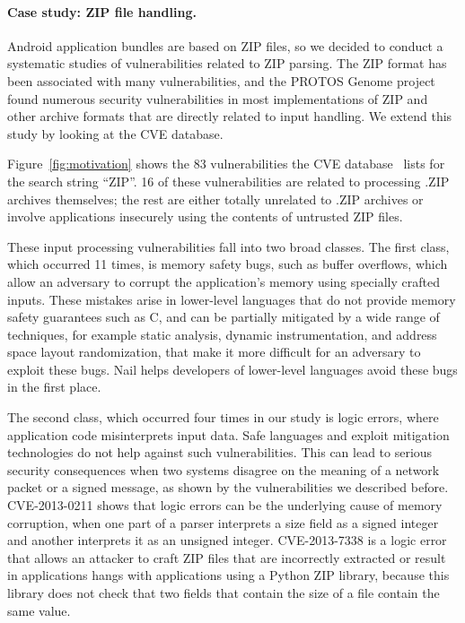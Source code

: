 \paragraph{Case study: ZIP file handling.}

Android application bundles are based on ZIP files, so we decided to conduct a systematic studies of
vulnerabilities related to ZIP parsing.  
The ZIP format has been associated with many vulnerabilities, and the
PROTOS Genome project~\cite{protos-c10-archive} found numerous security vulnerabilities in most
implementations of ZIP and other archive formats that are directly
related to input handling. We extend this study by looking at the CVE database.


Figure~\ref{fig:motivation} shows  the 83 vulnerabilities the CVE database~\cite{cve-database} lists
 for the search string ``ZIP''. 16 of these vulnerabilities are related to processing .ZIP archives
 themselves; the rest are either totally unrelated to .ZIP archives or involve applications insecurely using
 the contents of untrusted ZIP files.


These input processing vulnerabilities fall into two broad classes.  The first
class, which occurred 11 times, is memory safety bugs, such as buffer overflows, which allow an
adversary to corrupt the application's memory using specially crafted
inputs.  These mistakes arise in lower-level languages that do not
provide memory safety guarantees such as C, and can be partially
mitigated by a wide range of techniques, for example static analysis,
dynamic instrumentation, and address space layout randomization, that
make it more difficult for an adversary to exploit these bugs.
Nail helps developers of lower-level languages avoid these bugs
in the first place.

The second class, which occurred four times in our study is logic errors, where application code
misinterprets input data. Safe languages and exploit mitigation technologies do not help against
such vulnerabilities. This can lead to serious security consequences when two systems disagree on
the meaning of a network packet or a signed message, as shown by the vulnerabilities we described
before. CVE-2013-0211 shows that logic errors can be the underlying cause of memory corruption, when
one part of a parser interprets a size field as a signed integer and another interprets it as an
unsigned integer. CVE-2013-7338 is a logic error that allows an attacker to craft ZIP files that are
incorrectly extracted or result in applications hangs with applications using a Python ZIP library,
because this library does not check that two fields that contain the size of a file contain the same value.

